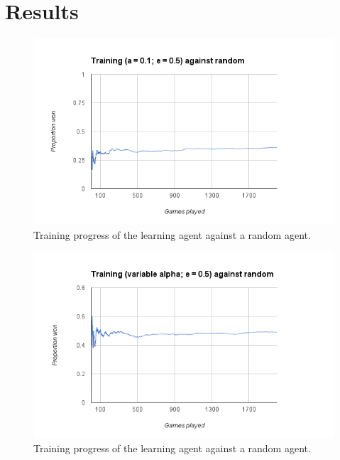 \documentclass[letterpaper]{article}
\begin{document}
\section{Results}

\begin{figure}
  \vspace{-2em}
  \begin{center}
    \includegraphics[width=\textwidth]{a1e5training.png}
    \vspace{-3em}
  \caption{Training progress of the learning agent against a random agent.\label{a1e5}}
  \vspace{-1em}
  \end{center}
\end{figure}

\begin{figure}
  \vspace{-2em}
  \begin{center}
    \includegraphics[width=\textwidth]{varae5training.png}
    \vspace{-3em}
  \caption{Training progress of the learning agent against a random agent.\label{ave5}}
  \vspace{-1em}
  \end{center}
\end{figure}
\end{document}
